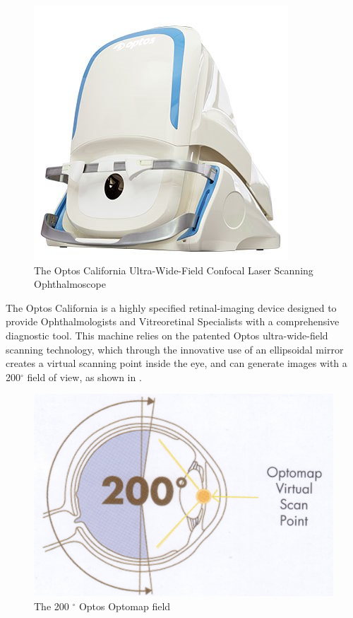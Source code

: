 \begin{figure}[htbp]
\centering
 \includegraphics{figures/california}
\caption{The Optos California Ultra-Wide-Field Confocal Laser Scanning Ophthalmoscope}
\label{fig:cali}
    \end{figure}


The Optos California is a highly specified retinal-imaging device designed to provide Ophthalmologists and Vitreoretinal Specialists with a comprehensive diagnostic tool. This machine relies on the patented Optos ultra-wide-field scanning technology, which through the innovative use of an ellipsoidal mirror creates a virtual scanning point inside the eye, and can generate images with a 200$^\circ$ field of view, as shown in .  

\begin{figure}[htbp]
\centering
 \includegraphics{figures/optoswide}
\caption{The 200 $^\circ$ Optos Optomap field}
\label{fig:wideview}
    \end{figure}

